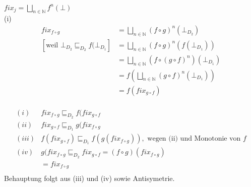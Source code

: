 \documentclass[ngerman,a4paper]{report}
\begin{document}
$fix_j = \bigsqcup\limits_{n\in\mathbb{N}} f^n (\bot)$\\
(i)
\begin{align*}
	fix_{f\circ g}& = \bigsqcup\limits_{n\in\mathbb{N}}(f\circ g)^n (\bot_{D_2})\\
	\left[\text{weil } \bot_{D_2}\sqsubseteq_{D_2} f(\bot_{D_1}\right]	&=\bigsqcup\limits_{n\in\mathbb{N}} (f \circ g)^n (f(\bot_{D_1}))\\
	&=\bigsqcup\limits_{n\in\mathbb{N}} (f \circ (g\circ f)^n) (\bot_{D_1})\\
	&=f(\bigsqcup\limits_{n\in\mathbb{N}} (g \circ f)^n (\bot_{D_1}))\\
	&=f(fix_{g\circ f})\\
\end{align*}

\begin{align*}
	(i)& fix_{f\circ g} \sqsubseteq_{D_2} f(fix_{g\circ f}\\
	(ii) & fix_{g\circ f} \sqsubseteq_{D_1} g(fix_{f\circ g}\\
	(iii) &f(fix_{g\circ f}) \sqsubseteq_{D_1} f(g(fix_{f\circ g})), \text{ wegen (ii) und Monotonie von } f\\
	(iv) &g(fix_{f\circ g} \sqsubseteq_{D_2} fix_{g\circ f} = (f\circ g) (fix_{f\circ g})\\
	  &=fix_{f\circ g}\\
\end{align*}
Behauptung folgt aus (iii) und (iv) sowie Antisymetrie.
\end{document}
